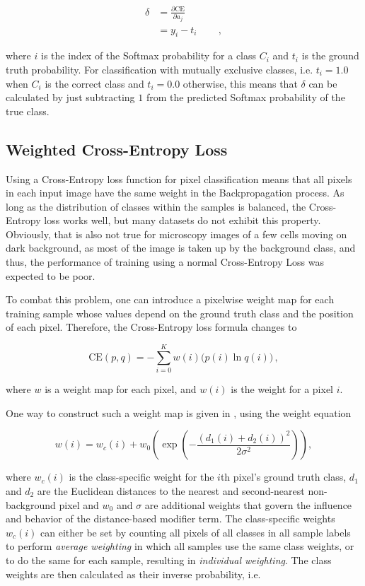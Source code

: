 \begin {align} \delta &= \frac{\partial \text{CE}}{\partial a_j}\\  
			    &= y_i - t_i \hspace{2em} \,,
\end {align}

\noindent where $i$ is the index of the Softmax probability for a class $C_i$ and $t_i$ is the ground truth probability. \cite[]{bishop_pattern} For classification with mutually exclusive classes, i.e. $t_i = 1.0$ when $C_i$ is the correct class and $t_i = 0.0$ otherwise, this means that $\delta$ can be calculated by just subtracting $1$ from the predicted Softmax probability of the true class.


		\subsection{Weighted Cross-Entropy Loss}

Using a Cross-Entropy loss function for pixel classification means that all pixels in each input image have the same weight in the Backpropagation process. As long as the distribution of classes within the samples is balanced, the Cross-Entropy loss works well, but many datasets do not exhibit this property. Obviously, that is also not true for microscopy images of a few cells moving on dark background, as most of the image is taken up by the background class, and thus, the performance of training using a normal Cross-Entropy Loss was expected to be poor.

To combat this problem, one can introduce a pixelwise weight map for each training sample whose values depend on the ground truth class and the position of each pixel. Therefore, the Cross-Entropy loss formula changes to

\[ \text{CE}(p, q) = -\sum \limits_{i = 0}^{K} w(i) \bigg ( p(i) \ln q(i) \bigg ) \,, \]

\noindent where $w$ is a weight map for each pixel, and $w(i)$ is the weight for a pixel $i$.

One way to construct such a weight map is given in \cite{unet}, using the weight equation

\[ w(i) = w_c(i) + w_0 \left ( \exp \left (- \frac{(d_1(i) + d_2(i))^2}{2\sigma^2} \right ) \right ), \]

\noindent where $w_c(i)$ is the class-specific weight for the $i$th pixel's ground truth class, $d_1$ and $d_2$ are the Euclidean distances to the nearest and second-nearest non-background pixel and $w_0$ and $\sigma$ are additional weights that govern the influence and behavior of the distance-based modifier term. The class-specific weights $w_c(i)$ can either be set by counting all pixels of all classes in all sample labels to perform \textit{average weighting} in which all samples use the same class weights, or to do the same for each sample, resulting in \textit{individual weighting}. The class weights are then calculated as their inverse probability, i.e.

